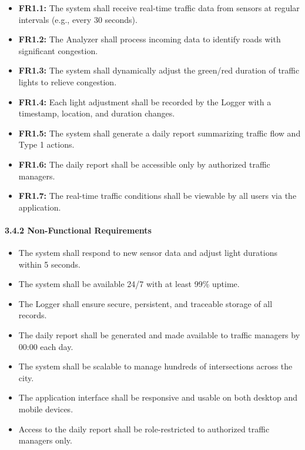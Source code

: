 \begin{itemize}
    \item \textbf{FR1.1:} The system shall receive real-time traffic data from sensors at regular intervals (e.g., every 30 seconds).
    \item \textbf{FR1.2:} The Analyzer shall process incoming data to identify roads with significant congestion.
    \item \textbf{FR1.3:} The system shall dynamically adjust the green/red duration of traffic lights to relieve congestion.
    \item \textbf{FR1.4:} Each light adjustment shall be recorded by the Logger with a timestamp, location, and duration changes.
    \item \textbf{FR1.5:} The system shall generate a daily report summarizing traffic flow and Type 1 actions.
    \item \textbf{FR1.6:} The daily report shall be accessible only by authorized traffic managers.
    \item \textbf{FR1.7:} The real-time traffic conditions shall be viewable by all users via the application.
\end{itemize}

\paragraph{3.4.2 Non-Functional Requirements}

\begin{itemize}
    \item The system shall respond to new sensor data and adjust light durations within 5 seconds.
    \item The system shall be available 24/7 with at least 99\% uptime.
    \item The Logger shall ensure secure, persistent, and traceable storage of all records.
    \item The daily report shall be generated and made available to traffic managers by 00:00 each day.
    \item The system shall be scalable to manage hundreds of intersections across the city.
    \item The application interface shall be responsive and usable on both desktop and mobile devices.
    \item Access to the daily report shall be role-restricted to authorized traffic managers only.
\end{itemize}